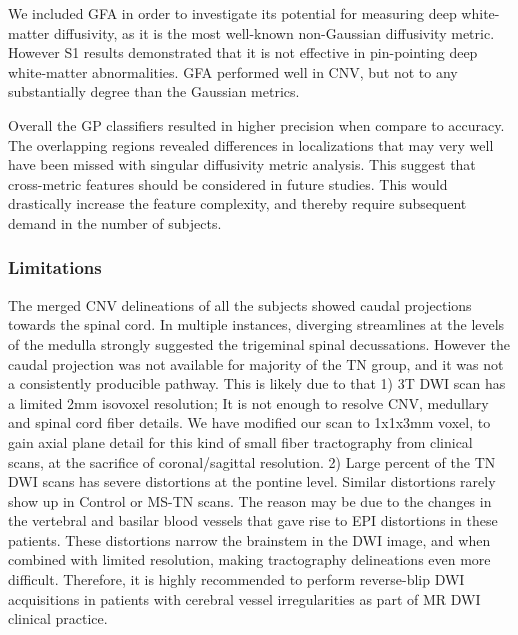 We included GFA in order to investigate its potential for measuring deep white-matter diffusivity, as it is the most well-known non-Gaussian diffusivity metric. However S1 results demonstrated that it is not effective in pin-pointing deep white-matter abnormalities. GFA performed well in CNV, but not to any substantially degree than the Gaussian metrics. 

Overall the GP classifiers resulted in higher precision when compare to accuracy. The overlapping regions revealed differences in localizations that may very well have been missed with singular diffusivity metric analysis. This suggest that cross-metric features should be considered in future studies. This would drastically increase the feature complexity, and thereby require subsequent demand in the number of subjects. 

\subsubsection{Limitations}
The merged CNV delineations of all the subjects showed caudal projections towards the spinal cord. In multiple instances, diverging streamlines at the levels of the medulla strongly suggested the trigeminal spinal decussations. However the caudal projection was not available for majority of the TN group, and it was not a consistently producible pathway. This is likely due to that 1) 3T DWI scan has a limited 2mm isovoxel resolution; It is not enough to resolve CNV, medullary and spinal cord fiber details. We have modified our scan to 1x1x3mm voxel, to gain axial plane detail for this kind of small fiber tractography from clinical scans, at the sacrifice of coronal/sagittal resolution. 2) Large percent of the TN DWI scans has severe distortions at the pontine level. Similar distortions rarely show up in Control or MS-TN scans. The reason may be due to the changes in the vertebral and basilar blood vessels that gave rise to EPI distortions in these patients. These distortions narrow the brainstem in the DWI image, and when combined with limited resolution, making tractography delineations even more difficult. Therefore, it is highly recommended to perform reverse-blip DWI acquisitions in patients with cerebral vessel irregularities as part of MR DWI clinical practice. 

